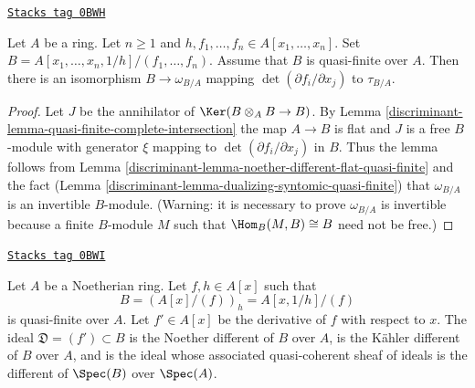 \begin{lemma}
\label{discriminant-lemma-different-quasi-finite-complete-intersection}
\href{https://stacks.math.columbia.edu/tag/0BWH}{\texttt{Stacks tag 0BWH}}

Let $A$ be a ring. Let $n \geq 1$ and
$h, f_1, \ldots, f_n \in A[x_1, \ldots, x_n]$.
Set $B = A[x_1, \ldots, x_n, 1/h]/(f_1, \ldots, f_n)$.
Assume that $B$ is quasi-finite over $A$.
Then there is an isomorphism $B \to \omega_{B/A}$
mapping $\det(\partial f_i/\partial x_j)$ to $\tau_{B/A}$.
\end{lemma}

\begin{proof}

Let $J$ be the annihilator of $\Ker(B \otimes_A B \to B)$.
By Lemma \ref{discriminant-lemma-quasi-finite-complete-intersection}
the map $A \to B$ is flat and
$J$ is a free $B$-module with generator $\xi$ mapping to
$\det(\partial f_i/\partial x_j)$ in $B$.
Thus the lemma follows from
Lemma \ref{discriminant-lemma-noether-different-flat-quasi-finite}
and the fact (Lemma \ref{discriminant-lemma-dualizing-syntomic-quasi-finite})
that $\omega_{B/A}$ is an invertible $B$-module.
(Warning: it is necessary to prove $\omega_{B/A}$
is invertible because a finite $B$-module $M$ such
that $\Hom_B(M, B) \cong B$ need not be free.)
\end{proof}

\begin{example}
\label{discriminant-example-different-for-monogenic}
\href{https://stacks.math.columbia.edu/tag/0BWI}{\texttt{Stacks tag 0BWI}}

Let $A$ be a Noetherian ring. Let $f, h \in A[x]$ such that
$$
B = (A[x]/(f))_h = A[x, 1/h]/(f)
$$
is quasi-finite over $A$. Let $f' \in A[x]$ be the derivative
of $f$ with respect to $x$. The ideal $\mathfrak{D} = (f') \subset B$
is the Noether different of $B$ over $A$,
is the K\"ahler different of $B$ over $A$, and
is the ideal whose associated quasi-coherent sheaf of ideals is the
different of $\Spec(B)$ over $\Spec(A)$.
\end{example}

